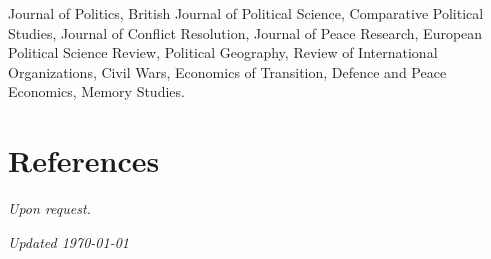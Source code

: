 \documentclass[a4paper, 12pt]{article}
\begin{document}
Journal of Politics, British Journal of Political Science, Comparative Political Studies, Journal of Conflict Resolution, Journal of Peace Research, European Political Science Review, Political Geography, Review of International Organizations, Civil Wars, Economics of Transition, Defence and Peace Economics, Memory Studies.


\section*{References}

\textit{Upon request.}

%
%
%

\vfill

\noindent
\flushright
{\small\it Updated \monthdate\today}
\end{document}
